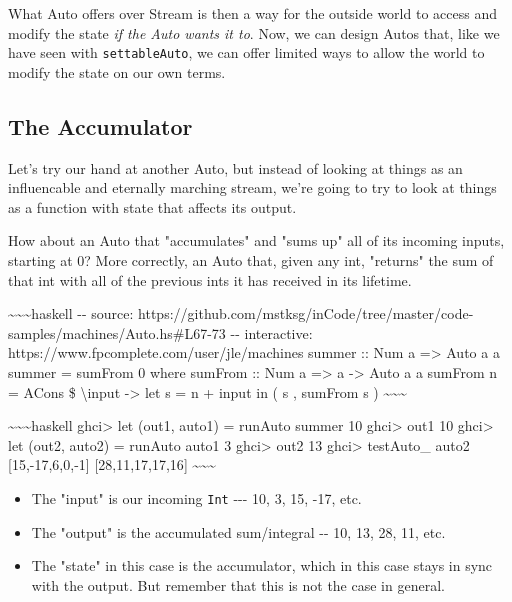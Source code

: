 \documentclass[]{article}
\begin{document}
What Auto offers over Stream is then a way for the outside world to access and
modify the state \emph{if the Auto wants it to}. Now, we can design Autos that,
like we have seen with \texttt{settableAuto}, we can offer limited ways to allow
the world to modify the state on our own terms.

\subsection{The Accumulator}

Let's try our hand at another Auto, but instead of looking at things as an
influencable and eternally marching stream, we're going to try to look at things
as a function with state that affects its output.

How about an Auto that "accumulates" and "sums up" all of its incoming inputs,
starting at 0? More correctly, an Auto that, given any int, "returns" the sum of
that int with all of the previous ints it has received in its lifetime.

\textasciitilde{}\textasciitilde{}\textasciitilde{}haskell -\/- source:
https://github.com/mstksg/inCode/tree/master/code-samples/machines/Auto.hs\#L67-73
-\/- interactive: https://www.fpcomplete.com/user/jle/machines summer :: Num a
=\textgreater{} Auto a a summer = sumFrom 0 where sumFrom :: Num a
=\textgreater{} a -\textgreater{} Auto a a sumFrom n = ACons \$
\textbackslash{}input -\textgreater{} let s = n + input in ( s , sumFrom s )
\textasciitilde{}\textasciitilde{}\textasciitilde{}

\textasciitilde{}\textasciitilde{}\textasciitilde{}haskell ghci\textgreater{}
let (out1, auto1) = runAuto summer 10 ghci\textgreater{} out1 10
ghci\textgreater{} let (out2, auto2) = runAuto auto1 3 ghci\textgreater{} out2
13 ghci\textgreater{} testAuto\_ auto2 {[}15,-17,6,0,-1{]} {[}28,11,17,17,16{]}
\textasciitilde{}\textasciitilde{}\textasciitilde{}

\begin{itemize}
\tightlist
\item
  The "input" is our incoming \texttt{Int} -\/-\/- 10, 3, 15, -17, etc.
\item
  The "output" is the accumulated sum/integral -\/- 10, 13, 28, 11, etc.
\item
  The "state" in this case is the accumulator, which in this case stays in sync
  with the output. But remember that this is not the case in general.
\end{itemize}
\end{document}
